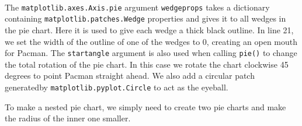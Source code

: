 \documentclass[11pt]{article}
\begin{document}
    \begin{center}
    \end{center}
    { \hspace*{\fill} \\}
    
    The \texttt{matplotlib.axes.Axis.pie} argument \texttt{wedgeprops} takes
a dictionary containing \texttt{matplotlib.patches.Wedge} properties and
gives it to all wedges in the pie chart. Here it is used to give each
wedge a thick black outline. In line 21, we set the width of the outline
of one of the wedges to 0, creating an open mouth for Pacman. The
\texttt{startangle} argument is also used when calling \texttt{pie()} to
change the total rotation of the pie chart. In this case we rotate the
chart clockwise 45 degrees to point Pacman straight ahead. We also add a
circular patch generatedby \texttt{matplotlib.pyplot.Circle} to act as
the eyeball.

    To make a nested pie chart, we simply need to create two pie charts and
make the radius of the inner one smaller.
\end{document}
